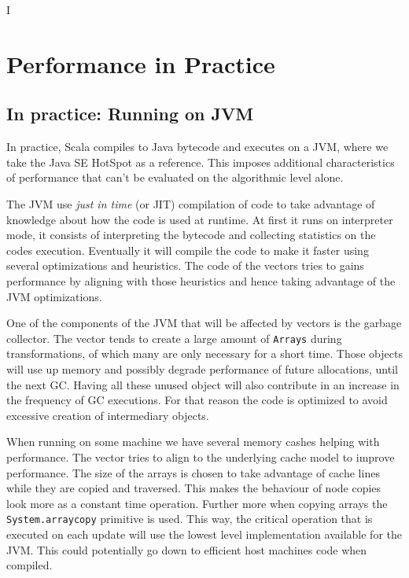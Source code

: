 I%

\chapter{ Performance in Practice} %

\label{Performance} %



\section{In practice: Running on JVM}
\label{InPractice}

In practice, Scala compiles to Java bytecode and executes on a JVM, where we take the Java SE HotSpot as a reference. This imposes additional characteristics of performance that can't be evaluated on the algorithmic level alone.

The JVM use \emph{just in time} (or JIT) compilation of code to take advantage of knowledge about how the code is used at runtime. At first it runs on interpreter mode, it consists of interpreting the bytecode and collecting statistics on the codes execution. Eventually it will compile the code to make it faster using several optimizations and heuristics. The code of the vectors tries to gains performance by aligning with those heuristics and hence taking advantage of the JVM optimizations.

One of the components of the JVM that will be affected by vectors is the garbage collector. The vector tends to create a large amount of \texttt{Arrays} during transformations, of which many are only necessary for a short time. Those objects will use up memory and possibly degrade performance of future allocations, until the next GC. Having all these unused object will also contribute in an increase in the frequency of GC executions. For that reason the code is optimized to avoid excessive creation of intermediary objects.

When running on some machine we have several memory cashes helping with performance. The vector tries to align to the underlying cache model to improve performance. The size of the arrays is chosen to take advantage of cache lines while they are copied and traversed. This makes the behaviour of node copies look more as a constant time operation. Further more when copying arrays the \texttt{System.arraycopy} primitive is used. This way, the critical operation that is executed on each update will use the lowest level implementation available for the JVM. This could potentially go down to efficient host machines code when compiled.

